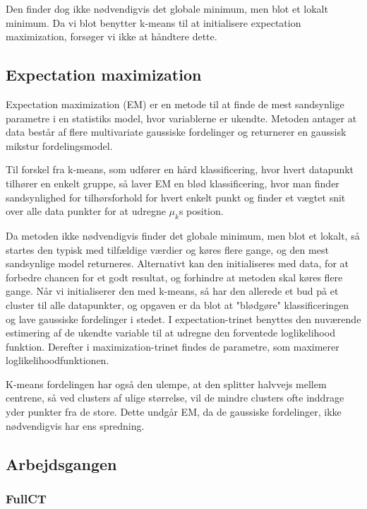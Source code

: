 Den finder dog ikke nødvendigvis det globale minimum, men blot et lokalt
minimum. Da vi blot benytter k-means til at initialisere expectation
maximization, forsøger vi ikke at håndtere dette.

\subsection{Expectation maximization}


Expectation maximization (EM) er en metode til at finde de mest
sandsynlige parametre i en statistiks model, hvor variablerne er
ukendte. Metoden antager at data består af flere multivariate gaussiske
fordelinger og returnerer en gaussisk mikstur fordelingsmodel.

Til forskel fra k-means, som udfører en hård klassificering, hvor
hvert datapunkt tilhører en enkelt gruppe, så laver EM en blød
klassificering, hvor man finder sandsynlighed for tilhørsforhold for
hvert enkelt punkt og finder et vægtet snit over alle data punkter for at
udregne $\mu_k$s position.

Da metoden ikke nødvendigvis finder det globale minimum, men blot et
lokalt, så startes den typisk med tilfældige værdier og køres flere
gange, og den mest sandsynlige model returneres. Alternativt kan den
initialiseres med data, for at forbedre chancen for et godt resultat,
og forhindre at metoden skal køres flere gange. Når vi initialiserer
den med k-means, så har den allerede et bud på et cluster til alle
datapunkter, og opgaven er da blot at "blødgøre" klassificeringen
og lave gaussiske fordelinger i stedet. I expectation-trinet benyttes
den nuværende estimering af de ukendte variable til at udregne den
forventede loglikelihood funktion. Derefter i maximization-trinet findes
de parametre, som maximerer loglikelihoodfunktionen.

K-means fordelingen har også den ulempe, at den splitter halvvejs mellem
centrene, så ved clusters af ulige størrelse, vil de mindre clusters ofte
inddrage yder punkter fra de store. Dette undgår EM, da de gaussiske
fordelinger, ikke nødvendigvis har ens spredning.


\subsection{Arbejdsgangen}


\subsubsection{FullCT}

